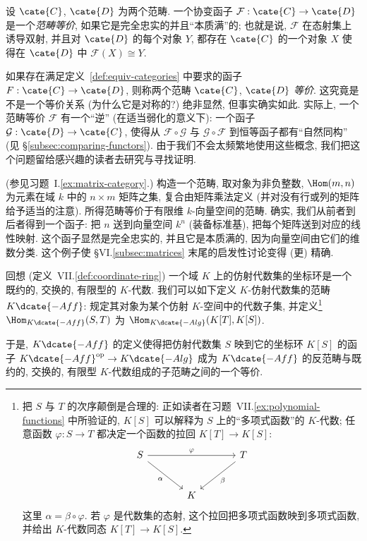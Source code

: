 \begin{definition}\label{def:equiv-categories}
设 $\cate{C}$, $\cate{D}$ 为两个范畴. 一个协变函子 $\mathcal{F}:\cate{C}\to\cate{D}$ 是一个\emph{范畴等价}, 如果它是完全忠实的并且``本质满''的; 也就是说, $\mathcal{F}$ 在态射集上诱导双射, 并且对 $\cate{D}$ 的每个对象 $Y$, 都存在 $\cate{C}$ 的一个对象 $X$ 使得在 $\cate{D}$ 中 $\mathcal{F}(X)\cong Y$.

如果存在满足定义~\ref{def:equiv-categories} 中要求的函子 $F:\cate{C}\to\cate{D}$, 则称两个范畴 $\cate{C}$, $\cate{D}$ \emph{等价}. 这究竟是不是一个等价关系 (为什么它是对称的?) 绝非显然, 但事实确实如此. 实际上, 一个范畴等价 $\mathcal{F}$ 有一个``逆'' (在适当弱化的意义下): 一个函子 $\mathcal{G}:\cate{D}\to\cate{C}$, 使得从 $\mathcal{F}\circ\mathcal{G}$ 与 $\mathcal{G}\circ\mathcal{F}$ 到恒等函子都有``自然同构'' (见 §\ref{subsec:comparing-functors}). 由于我们不会太频繁地使用这些概念, 我们把这个问题留给感兴趣的读者去研究与寻找证明.
\end{definition}

\begin{example}\label{ex:matrices-fd-vect}
(参见习题~I.\ref{ex:matrix-category}.) 构造一个范畴, 取对象为非负整数, $\Hom(m,n)$ 为元素在域 $k$ 中的 $n\times m$ 矩阵之集, 复合由矩阵乘法定义 (并对没有行或列的矩阵给予适当的注意). 所得范畴等价于有限维 $k$-向量空间的范畴. 确实, 我们从前者到后者得到一个函子: 把 $n$ 送到向量空间 $k^n$ (装备标准基), 把每个矩阵送到对应的线性映射. 这个函子显然是完全忠实的, 并且它是本质满的, 因为向量空间由它们的维数分类. 这个例子使 §VI.\ref{subsec:matrices} 末尾的启发性讨论变得 (更) 精确.
\end{example}

\begin{example}\label{ex:k-aff}
回想 (定义~VII.\ref{def:coordinate-ring}) 一个域 $K$ 上的仿射代数集的坐标环是一个既约的, 交换的, 有限型的 $K$-代数. 我们可以如下定义 $K$-仿射代数集的范畴 $K\dcate{-Aff}$: 规定其对象为某个仿射 $K$-空间中的代数子集, 并定义\footnote{把 $S$ 与 $T$ 的次序颠倒是合理的: 正如读者在习题~VII.\ref{ex:polynomial-functions} 中所验证的, $K[S]$ 可以解释为 $S$ 上的``多项式函数''的 $K$-代数; 任意函数 $\varphi:S\to T$ 都决定一个函数的拉回 $K[T]\to K[S]$:
\[\begin{tikzcd}[ampersand replacement=\&,column sep=large,row sep=large]
S \ar[rr,"\varphi"] \ar[dr,"\alpha"'] \& \& T \ar[dl,"\beta"] \\
\& K \&
\end{tikzcd}\]
这里 $\alpha=\beta\circ\varphi$. 若 $\varphi$ 是代数集的态射, 这个拉回把多项式函数映到多项式函数, 并给出 $K$-代数同态 $K[T]\to K[S]$.}$\Hom_{K\dcate{-Aff}}(S,T)$ 为 $\Hom_{K\dcate{-Alg}}(K[T],K[S])$.

于是, $K\dcate{-Aff}$ 的定义使得把仿射代数集 $S$ 映到它的坐标环 $K[S]$ 的函子 $K\dcate{-Aff}^{\mathrm{op}}\to K\dcate{-Alg}$ 成为 $K\dcate{-Aff}$ 的反范畴与既约的, 交换的, 有限型 $K$-代数组成的子范畴之间的一个等价.
\end{example}

